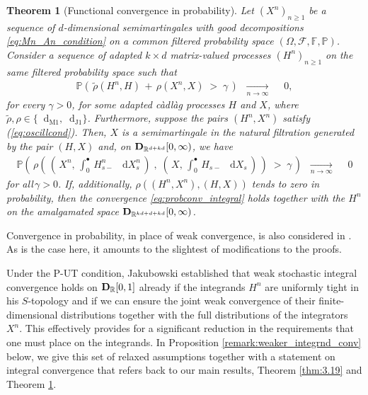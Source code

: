 \documentclass[11pt]{article}
\newtheorem{theorem}{Theorem}[section]
\theoremstyle{definition}\newtheorem{example}[theorem]{Example}
\theoremstyle{definition}\newtheorem{counterexample}[theorem]{Counterexample}
\theoremstyle{definition}\newtheorem{remark}[theorem]{Remark}
\theoremstyle{definition}\newtheorem{defi}[theorem]{Definition}
\numberwithin{equation}{section}
\newcommand{\R}{\mathbb{R}}
\newcommand{\D}{{\bf D}}											%
\newcommand{\F}{\mathbb{F}}											%
\newcommand*\diff{\mathop{}\!\mathrm{d}}								%
\newcommand{\Pro}{\mathbb{P}}										%
\renewcommand{\|}{\; : \, \;}											%
\newcommand{\conv}[2]{\; \xrightarrow[ {#1}]{#2} \; }						%
\newcommand{\dJ}{\diff_{\operatorname{J1}}}								%
\newcommand{\dM}{\diff_{\operatorname{M1}}}							%
\begin{document}
\begin{theorem}[Functional convergence in probability] \label{thm:2.12}   
	Let $(X^n)_{n\ge 1}$ be a sequence of $d$-dimensional semimartingales with good decompositions \eqref{eq:Mn_An_condition} on a common filtered probability space $(\Omega, \mathcal{F}, \F, \Pro)$. Consider a sequence of adapted $k\times d$ matrix-valued processes $(H^n)_{n\ge 1}$ on the same filtered probability space such that
	\begin{align} \Pro \left( \, \tilde \rho(H^n, H) \, + \, \rho(X^n, X) \; > \; \gamma\, \right) \; \conv{n\to \infty} \; \quad 0, \label{eq:probconv_HnXn}
	\end{align}
	for every $\gamma>0$, for some adapted càdlàg processes $H$ and $X$, where $\tilde{\rho},\rho \in \{\dM, \dJ\}$. Furthermore, suppose the pairs $(H^n, X^n)$ satisfy (\ref{eq:oscillcond}). Then, $X$ is a semimartingale in the natural filtration generated by the pair $(H, X)$ and, on $\D_{\R^{d+kd}}[0,\infty)$, we have
	\begin{align} \Pro \left( \, \rho \left( \, \left(\, X^n,\, \int_0^\bullet \, H^n_{s-} \; \diff X^n_s\, \right) \; ,  \; \left( \, X, \, \int_0^\bullet \, H_{s-} \; \diff X_s\, \right) \, \right) \; > \; \gamma\, \right) \; \conv{n \to \infty} \; \quad 0 \label{eq:probconv_integral} \end{align}
	for all\;\,$\gamma>0$. If, additionally, $\rho((H^n, X^n), (H, X))$ tends to zero in probability, then the convergence \eqref{eq:probconv_integral} holds together with the $H^n$ on the amalgamated space $\D_{\R^{kd+d+kd}}[0,\infty)$.
\end{theorem} 

Convergence in probability, in place of weak convergence, is also considered in \cite{jakubowskimeminpages,kurtzprotter,jakubowski}. As is the case here, it amounts to the slightest of modifications to the proofs.

Under the P-UT condition, Jakubowski \cite{jakubowski} established that weak stochastic integral convergence holds on $\D_{\R}[0,1]$ already if the integrands $H^n$ are uniformly tight in his $S$-topology and if we can ensure the joint weak convergence of their finite-dimensional distributions together with the full distributions of the integrators $X^n$. This effectively provides for a significant reduction in the requirements that one must place on the integrands. In Proposition \ref{remark:weaker_integrnd_conv} below, we give this set of relaxed assumptions together with a statement on integral convergence that refers back to our main results, Theorem \ref{thm:3.19} and Theorem \ref{thm:2.12}.
\end{document}
